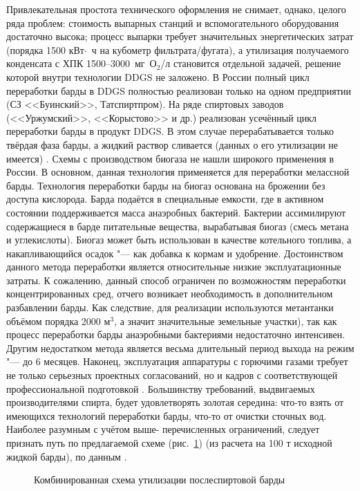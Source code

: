 Привлекательная простота технического оформления не снимает, однако, целого ряда проблем: стоимость выпарных станций и вспомогательного оборудования достаточно высока; процесс выпарки требует значительных энергетических затрат (порядка 1500 кВт$\cdot$~ч на кубометр фильтрата/фугата), а утилизация получаемого конденсата с ХПК 1500--3000~мг~О$_{2}$/л становится отдельной задачей, решение которой внутри технологии DDGS не заложено. 
В России полный цикл переработки барды в DDGS полностью реализован только на одном предприятии (СЗ <<Буинский>>, Татспиртпром). 
На ряде спиртовых заводов (<<Уржумский>>, <<Корыстово>> и др.) реализован усечённый цикл переработки барды в продукт DDGS. 
В этом случае перерабатывается только твёрдая фаза барды, а жидкий раствор сливается (данных о его утилизации не имеется) \cite{web_spbarda}. 
Схемы с производством биогаза не нашли широкого применения в России. 
В основном, данная технология применяется для переработки мелассной барды. 
Технология переработки барды на биогаз основана на брожении без доступа кислорода. 
Барда подаётся в специальные емкости, где в активном состоянии поддерживается масса анаэробных бактерий.
Бактерии ассимилируют содержащиеся в барде питательные вещества, вырабатывая биогаз (смесь метана и углекислоты). Биогаз может быть использован в качестве котельного топлива, а накапливающийся осадок "--- как добавка к кормам и удобрение. 
Достоинством данного метода переработки является относительные низкие эксплуатационные затраты. К сожалению, данный способ ограничен по возможностям переработки концентрированных сред, отчего возникает необходимость в дополнительном разбавлении барды. 
Как следствие, для реализации используются метантанки объёмом порядка 2000 м$^3$, а значит значительные земельные участки), так как процесс переработки барды анаэробными бактериями недостаточно интенсивен. 
Другим недостатком метода является весьма длительный период выхода на режим "--- до 6 месяцев. 
Наконец, эксплуатация аппаратуры с горючими газами требует не только серьезных проектных согласований, но и кадров с соответствующей профессиональной подготовкой \cite{web_spbarda}. 
Большинству требований, выдвигаемых производителями спирта, будет удовлетворять золотая середина: что-то взять от имеющихся технологий переработки барды, что-то от очистки сточных вод. 
Наиболее разумным с учётом выше- перечисленных ограничений, следует признать путь по предлагаемой схеме (рис.~\ref{ShemaKomb}) (из расчета на 100 т исходной жидкой барды), по данным \cite{Novikov_2007_2_Journal}. 

\begin{figure} 
\centering 
\begin{footnotesize} 
\def\svgwidth{0.884\linewidth} 
 
\end{footnotesize} 
\caption{Комбинированная схема утилизации послеспиртовой барды} 
\label{ShemaKomb} 
\end{figure} 

